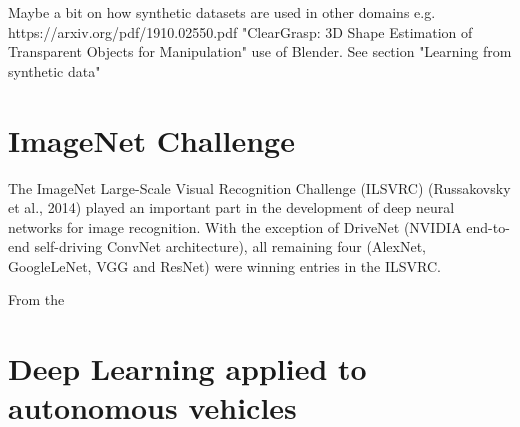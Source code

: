 
Maybe a bit on how synthetic datasets are used in other domains e.g. https://arxiv.org/pdf/1910.02550.pdf "ClearGrasp:
3D Shape Estimation of Transparent Objects for Manipulation" use of Blender. See section "Learning from synthetic data"










\section{ImageNet Challenge}

The  ImageNet Large-Scale Visual Recognition Challenge (ILSVRC) (Russakovsky et al., 2014) played an important part in the development of deep neural networks for image recognition. With the exception of DriveNet (NVIDIA end-to-end self-driving ConvNet architecture), all remaining four (AlexNet, GoogleLeNet, VGG and ResNet) were winning entries in the ILSVRC.  

From the 

\section{Deep Learning applied to autonomous vehicles}

